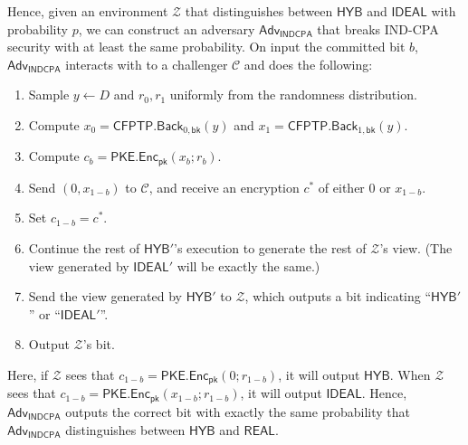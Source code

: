 \documentclass{article}[12pt]
\newcommand{\PKE}{\mathsf{PKE}}
\newcommand{\Enc}{\mathsf{Enc}}
\newcommand{\Indcpa}{\mathsf{INDCPA}}
\newcommand{\IndcpaGM}{\mathcal{C}} %
\newcommand{\EncKey}{\mathsf{pk}}
\newcommand{\CFPTP}{\mathsf{CFPTP}}
\newcommand{\Back}{\mathsf{Back}}
\newcommand{\BackKey}{\mathsf{bk}}
\newcommand{\Domain}{D}
\newcommand{\Adversary}{{\mathsf{Adv}}} %
\newcommand{\Environment}{{\mathcal{Z}}} %
\newcommand{\IndcpaAdversary}{{\Adversary_\Indcpa}}
\newcommand{\Ideal}{{\mathsf{IDEAL}}}
\newcommand{\Hyb}{{\mathsf{HYB}}}
\newcommand{\Real}{{\mathsf{REAL}}}
\begin{document}
Hence, given an environment $\Environment$ that distinguishes between $\Hyb$ and $\Ideal$ with probability $p$, we can construct an adversary $\IndcpaAdversary$ that breaks IND-CPA security with at least the same probability. On input the committed bit $b$, $\IndcpaAdversary$ interacts with to a challenger $\IndcpaGM$ and does the following:
\begin{enumerate}
	\item Sample $y \gets \Domain$ and $r_0, r_1$ uniformly from the randomness distribution.
	\item Compute $x_0 = \CFPTP.\Back_{0, \BackKey}(y)$ and $x_1 = \CFPTP.\Back_{1, \BackKey}(y)$.
	\item Compute $c_b = \PKE.\Enc_{\EncKey}(x_b; r_b)$.
	\item Send $(0, x_{1-b})$ to $\IndcpaGM$, and receive an encryption $c^*$ of either $0$ or $x_{1-b}$.
	\item Set $c_{1-b} = c^*$.
	\item Continue the rest of $\Hyb'$'s execution to generate the rest of $\Environment$'s view. (The view generated by $\Ideal'$ will be exactly the same.)
	\item Send the view generated by $\Hyb'$ to $\Environment$, which outputs a bit indicating ``$\Hyb'$'' or ``$\Ideal'$''.
	\item Output $\Environment$'s bit.
\end{enumerate}

Here, if $\Environment$ sees that $c_{1-b} = \PKE.\Enc_\EncKey(0; r_{1-b})$, it will output $\Hyb$. When $\Environment$ sees that $c_{1-b} = \PKE.\Enc_\EncKey(x_{1-b}; r_{1-b})$, it will output $\Ideal$. Hence, $\IndcpaAdversary$ outputs the correct bit with exactly the same probability that $\IndcpaAdversary$ distinguishes between $\Hyb$ and $\Real$.
\end{document}
